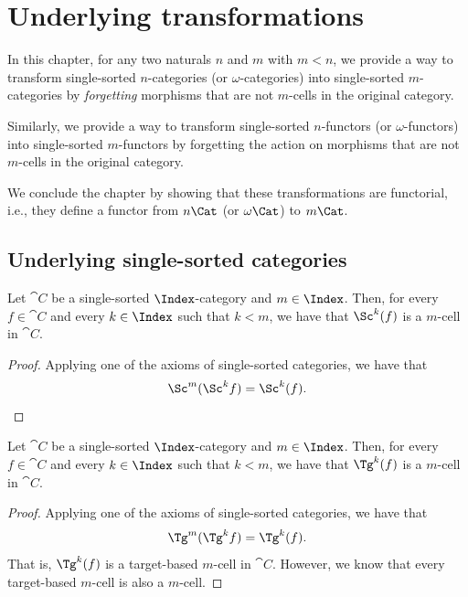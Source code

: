\chapter{Underlying transformations}
\label{ch:underlying}

In this chapter, for any two naturals $n$ and $m$ with $m < n$, we provide a way to transform
single-sorted $n$-categories (or $\omega$-categories) into single-sorted $m$-categories by
\emph{forgetting} morphisms that are not $m$-cells in the original category.

Similarly, we provide a way to transform single-sorted $n$-functors (or $\omega$-functors) into
single-sorted $m$-functors by forgetting the action on morphisms that are not $m$-cells in the
original category.

We conclude the chapter by showing that these transformations are functorial, i.e., they define a
functor from $n\Cat$ (or $\omega\Cat$) to $m\Cat$.

\section{Underlying single-sorted categories}

\begin{lemma}
  \label{lem:underlying_source_is_cell}
  \leanok
  Let $\cat{C}$ be a single-sorted $\Index$-category and $m \in \Index$. Then, for every $f \in
  \cat{C}$ and every $k \in \Index$ such that $k < m$, we have that $\Sc^k (f)$ is a $m$-cell in
  $\cat{C}$.
\end{lemma}

\begin{proof}
  \leanok
  Applying one of the axioms of single-sorted categories, we have that
  \[
    \Sc^m (\Sc^k f) = \Sc^k (f).
  \]
\end{proof}

\begin{lemma}
  \label{lem:underlying_target_is_cell}
  \leanok
  Let $\cat{C}$ be a single-sorted $\Index$-category and $m \in \Index$. Then, for every $f \in
  \cat{C}$ and every $k \in \Index$ such that $k < m$, we have that $\Tg^k (f)$ is a $m$-cell in
  $\cat{C}$.
\end{lemma}

\begin{proof}
  \leanok
  Applying one of the axioms of single-sorted categories, we have that
  \[
    \Tg^m (\Tg^k f) = \Tg^k (f).
  \]
  That is, $\Tg^k (f)$ is a target-based $m$-cell in $\cat{C}$. However, we know that every
  target-based $m$-cell is also a $m$-cell.
\end{proof}

